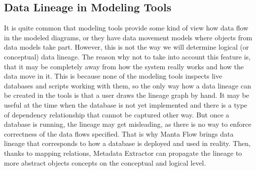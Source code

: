\subsection{Data Lineage in Modeling Tools}

It is quite common that modeling tools provide some kind of view how data flow in the modeled diagrams, or they have data movement models where objects from data models take part. 
However, this is not the way we will determine logical (or conceptual) data lineage.
The reason why not to take into account this feature is, that it may be completely away from how the system really works and how the data move in it. 
This is because none of the modeling tools inspects live databases and scripts working with them, so the only way how a data lineage can be created in the tools is that a user draws the lineage graph by hand. 
It may be useful at the time when the database is not yet implemented and there is a type of dependency relationship that cannot be captured other way. But once a database is running, the lineage may get misleading, as there is no way to enforce correctness of the data flows specified.
That is why Manta Flow brings data lineage that corresponds to how a database is deployed and used in reality. Then, thanks to mapping relations, Metadata Extractor can propagate the lineage to more abstract objects concepts on the conceptual and logical level.